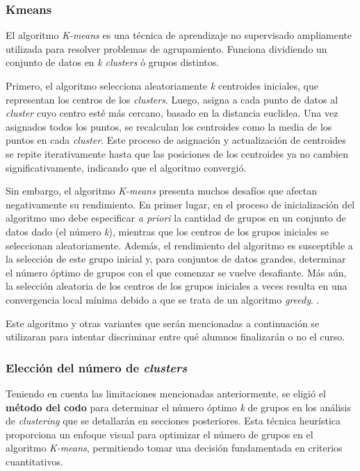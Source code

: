 \documentclass[11pt,a4paper,twoside,openany]{tesis}
\begin{document}
\subsubsection{Kmeans}\textbf{ } 

El algoritmo \emph{K-means} es una técnica de aprendizaje no supervisado ampliamente utilizada para resolver problemas de agrupamiento. Funciona dividiendo un conjunto de datos en \emph{k} \emph{clusters} ó grupos distintos. 

Primero, el algoritmo selecciona aleatoriamente \emph{k} centroides iniciales, que representan los centros de los \emph{clusters}. Luego, asigna a cada punto de datos al \emph{cluster} cuyo centro esté más cercano, basado en la distancia euclidea. Una vez asignados todos los puntos, se recalculan los centroides como la media de los puntos en cada \emph{cluster}. Este proceso de asignación y actualización de centroides se repite iterativamente hasta que las posiciones de los centroides ya no cambien significativamente, indicando que el algoritmo convergió. \cite{kmeans}

Sin embargo, el algoritmo \emph{K-means} presenta muchos desafíos que afectan negativamente su rendimiento. En primer lugar, en el proceso de inicialización del algoritmo uno debe especificar \emph{a priori} la cantidad de grupos en un conjunto de datos dado (el número \emph{k}), mientras que los centros de los grupos iniciales se seleccionan aleatoriamente. Además, el rendimiento del algoritmo es susceptible a la selección de este grupo inicial y, para conjuntos de datos grandes, determinar el número óptimo de grupos con el que comenzar se vuelve desafiante. Más aún, la selección aleatoria de los centros de los grupos iniciales a veces resulta en una convergencia local mínima debido a que se trata de un algoritmo \emph{greedy}. \cite{kmeans-limitaciones}.

Este algoritmo y otras variantes que serán mencionadas a continuación se utilizaran para intentar discriminar entre qué alumnos finalizarán o no el curso. 

\subsubsection{Elección del número de \emph{clusters}} \textbf{ } 


Teniendo en cuenta las limitaciones mencionadas anteriormente, se eligió el \textbf{método del codo} para determinar el número óptimo \emph{k} de grupos en los análisis de \emph{clustering} que se detallarán en secciones posteriores. Esta técnica heurística proporciona un enfoque visual para optimizar el número de grupos en el algoritmo \emph{K-means}, permitiendo tomar una decisión fundamentada en criterios cuantitativos.
\end{document}
